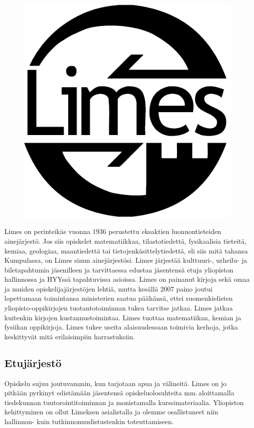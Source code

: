 \documentclass[a5paper, 8pt, twocolumn]{book} %
\numberwithin{equation}{section}
\begin{document}
\begin{figure}[!b]
	\includegraphics[width=\columnwidth]{isolimeslogo.png}
\end{figure}
Limes on perinteikäs vuonna 1936 perustettu
eksaktien luonnontieteiden ainejärjestö.
Jos siis opiskelet matematiikkaa,
tilastotiedettä, fysikaalisia tieteitä, kemiaa,
geologiaa, maantiedettä tai tietojenkäsittelytiedettä,
eli siis mitä tahansa Kumpulassa,
on Limes sinun ainejärjestösi.
Limes järjestää kulttuuri-, urheilu- ja
biletapahtumia jäsenilleen ja tarvittaessa
edustaa jäsentensä etuja yliopiston
hallinnossa ja HYYssä tapahtuvissa
asioissa. Limes on painanut kirjoja
sekä omaa ja muiden opiskelijajärjestöjen
lehtiä, mutta kesällä 2007 paino
joutui lopettamaan toimintansa ministerien
saatua päähänsä, ettei suomenkielisten
yliopisto-oppikirjojen
tuotantotoiminnan tukea tarvitse jatkaa.
Limes jatkaa kuitenkin kirjojen
kustannustoimintaa. Limes tuottaa matematiikan,
kemian ja fysiikan oppikirjoja.
Limes tukee useita alaisuudessaan toimivia
kerhoja, jotka keskittyvät mitä erilaisimpiin
harrastuksiin.
\subsection*{Etujärjestö}
Opiskelu sujuu joutuvammin, kun tarjotaan
apua ja välineitä. Limes on jo pitkään
pyrkinyt edistämään jäsentensä opiskelu\-olo\-suhteita
mm.\,aloittamalla tiede\-kunnan
tuutorointi\-toiminnan ja monistamalla kurssi\-materiaalia.
Yliopiston kehittyminen on
ollut Limeksen asia\-listalla ja olemme osallistuneet
niin hallinnon- kuin tutkinnon\-uudistustenkin
toteuttamiseen.
\end{document}

